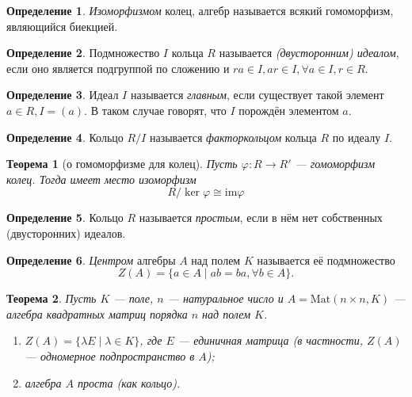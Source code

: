 \documentclass[a4paper]{article}
\theoremstyle{plain}
\newtheorem*{theorem}{Теорема}
\theoremstyle{definition}
\newtheorem{definition}{Определение}
\numberwithin{definition}{section}
\numberwithin{proposal}{section}
\newcommand{\im}{\mathrm{im}}
\begin{document}
\begin{definition}
\emph{Изоморфизмом} колец, алгебр называется всякий гомоморфизм, являющийся биекцией.
\end{definition}

\begin{definition}
Подмножество \(I\) кольца \(R\) называется \emph{(двусторонним) идеалом}, если оно является подгруппой по сложению и \(ra \in I, ar \in I, \forall a \in I, r \in R\).
\end{definition}

\begin{definition}
Идеал \(I\) называется \emph{главным}, если существует такой элемент \(a \in R, I = (a)\). В таком случае говорят, что \(I\) порождён элементом \(a\). 
\end{definition}

\begin{definition}
Кольцо \(R/I\) называется \emph{факторкольцом} кольца \(R\) по идеалу \(I\).
\end{definition}

\begin{theorem}[о гомоморфизме для колец]
Пусть \(\varphi: R \rightarrow R'\) --- гомоморфизм колец. Тогда имеет место изоморфизм
\begin{equation*}
	R / \ker \varphi \cong \im \varphi
\end{equation*}
\end{theorem}

\begin{definition}
Кольцо \(R\) называется \emph{простым}, если в нём нет собственных (двусторонних) идеалов.
\end{definition}

\begin{definition}
\emph{Центром} алгебры \(A\) над полем \(K\) называется её подмножество
\begin{equation*}
	Z(A) = \{a \in A \;|\; ab = ba, \forall b \in A\}.
\end{equation*}
\end{definition}

\begin{theorem}
Пусть \(K\) --- поле, \(n\) --- натуральное число и \(A = \mathrm{Mat}(n \times n, K)\) --- алгебра квадратных матриц порядка \(n\) над полем \(K\).
\begin{enumerate}
	\item \(Z(A) = \{\lambda{}E \;|\; \lambda \in K\}\), где \(E\) --- единичная матрица (в частности, \(Z(A)\) --- одномерное подпространство в \(A\));
	\item алгебра \(A\) проста (как кольцо).
\end{enumerate}
\end{theorem}
\end{document}
